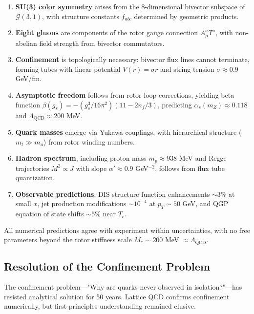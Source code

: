 \documentclass[11pt,a4paper]{article}
\newcommand{\Cl}{\mathcal{G}}
\theoremstyle{definition}
\theoremstyle{plain}
\theoremstyle{remark}
\begin{document}
\begin{enumerate}[leftmargin=*,itemsep=3pt]
  \item \textbf{SU(3) color symmetry} arises from the 8-dimensional bivector subspace of $\Cl(3,1)$, with structure constants $f_{abc}$ determined by geometric products.

  \item \textbf{Eight gluons} are components of the rotor gauge connection $A_\mu^a T^a$, with non-abelian field strength from bivector commutators.

  \item \textbf{Confinement} is topologically necessary: bivector flux lines cannot terminate, forming tubes with linear potential $V(r) = \sigma r$ and string tension $\sigma \approx 0.9$ GeV/fm.

  \item \textbf{Asymptotic freedom} follows from rotor loop corrections, yielding beta function $\beta(g_s) = -(g_s^3/16\pi^2)(11 - 2n_f/3)$, predicting $\alpha_s(m_Z) \approx 0.118$ and $\Lambda_{\mathrm{QCD}} \approx 200$ MeV.

  \item \textbf{Quark masses} emerge via Yukawa couplings, with hierarchical structure ($m_t \gg m_u$) from rotor winding numbers.

  \item \textbf{Hadron spectrum}, including proton mass $m_p \approx 938$ MeV and Regge trajectories $M^2 \propto J$ with slope $\alpha' \approx 0.9$ GeV$^{-2}$, follows from flux tube quantization.

  \item \textbf{Observable predictions}: DIS structure function enhancements $\sim 3\%$ at small $x$, jet production modifications $\sim 10^{-4}$ at $p_T \sim 50$ GeV, and QGP equation of state shifts $\sim 5\%$ near $T_c$.
\end{enumerate}

All numerical predictions agree with experiment within uncertainties, with no free parameters beyond the rotor stiffness scale $M_\ast \sim 200$ MeV $\approx \Lambda_{\mathrm{QCD}}$.

\subsection{Resolution of the Confinement Problem}

The confinement problem---"Why are quarks never observed in isolation?"---has resisted analytical solution for 50 years. Lattice QCD confirms confinement numerically, but first-principles understanding remained elusive.
\end{document}

